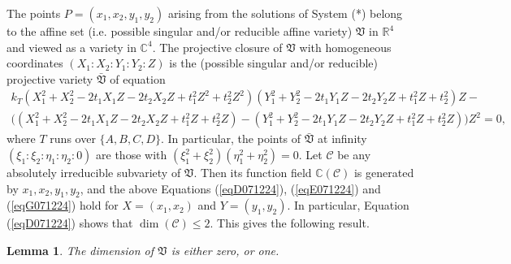 \documentclass[10pt]{amsart}
\newtheorem{lem}[thm]{Lemma}
\theoremstyle{definition}
\theoremstyle{remark}
\def\cC{\mathcal C}
\begin{document}
The points $P=(x_1,x_2,y_1,y_2)$ arising from the solutions of System (*) belong to the affine set (i.e. possible singular and/or reducible affine variety) $\mathfrak{V}$ in $\mathbb{R}^4$ and viewed as a variety in $\mathbb{C}^4$. The projective closure of $\mathfrak{V}$ with homogeneous coordinates $(X_1:X_2:Y_1:Y_2:Z)$ is the (possible singular and/or reducible) projective variety $\bar{\mathfrak{V}}$ of equation
\begin{equation}
\label{egybisAA}
\begin{array}{lll}
k_T (X_1^2+X_2^2-2t_1X_1Z-2t_2X_2Z+t_1^2Z^2+t_2^2Z^2)(Y_1^2+Y_2^2-2t_1Y_1Z-2t_2Y_2Z+t_1^2Z+t_2^2)Z-\\
\big((X_1^2+X_2^2-2t_1X_1Z-2t_2X_2Z+t_1^2Z+t_2^2Z)-(Y_1^2+Y_2^2-2t_1Y_1Z-2t_2Y_2Z+t_1^2Z+t_2^2Z))Z^2=0,
\end{array}
\end{equation}
where $T$ runs over $\{A,B,C,D\}$. In particular, the points of $\bar{\mathfrak{V}}$ at infinity $(\xi_1:\xi_2:\eta_1:\eta_2:0)$ are those with $(\xi_1^2+\xi_2^2)(\eta_1^2+\eta_2^2)=0$.
Let $\cC$ be any absolutely irreducible subvariety of $\mathfrak{V}$. Then its function field $\mathbb{C}(\cC)$ is generated by $x_1,x_2,y_1,y_2$, and the above Equations (\ref{eqD071224}), (\ref{eqE071224}) and (\ref{eqG071224}) hold for $X=(x_1,x_2)$ and $Y=(y_1,y_2)$.  In particular, Equation (\ref{eqD071224}) shows that $\dim(\cC)\le 2$. This gives the following result.
\begin{lem}
\label{lem071224} The dimension of $\mathfrak{V}$ is either zero, or one.
\end{lem}
\end{document}
